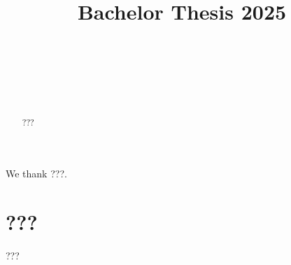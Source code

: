 \documentclass[ecta,nameyear,draft]{econsocart}
\begin{document}
\begin{frontmatter}

\title{Bachelor Thesis 2025}

\begin{aug}
%
%
%
\author[add1,add11]{~}
\author[add2]{~}
\author[add2]{~}
\address[add1]{%
,
}

\address[add11]{%
,
}

\address[add2]{%
,
}
\end{aug}

\begin{funding}
We thank ???.
\end{funding}
%
\begin{abstract}
???
\end{abstract}

\begin{keyword}
\end{keyword}

\end{frontmatter}

\section{???}

???
\end{document}
